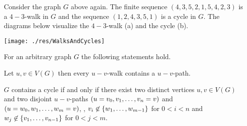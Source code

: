 \begin{exam}
Consider the graph $G$ above again. The finite sequence $(4, 3, 5, 2, 1, 5, 4, 2, 3)$ is a $4-3$-walk in $G$ and the sequence $(1,2,4,3,5,1)$ is a cycle in $G$. The diagrams below visualize the $4-3$-walk (a) and the cycle (b).

\begin{center}
\texttt{[image: ./res/WalksAndCycles]}
%     
%     
%     
\end{center}
\end{exam}
\begin{lem} For an arbitrary graph $G$ the following statements hold. \label{thm:Unique Paths}
\begin{thmlist}
\item Let $u,v\in V(G)$ then every $u-v$-walk contains a $u-v$-path.\label{thm:Every walk contains a trail}
\item $G$ contains a cycle if and only if there exist two distinct vertices $u,v\in V(G)$ and two disjoint $u-v$-paths $(u=v_0,\seq{v}=v)$ and $(u=w_0,\seq[m]{w}=v)$, \ie, $v_i\not\in\lbrace\seq[m-1]{w}\rbrace$ for $0<i<n$ and $w_j\not\in\lbrace\seq[n-1]{v}\rbrace$ for $0<j<m$.
\end{thmlist}
\end{lem}
